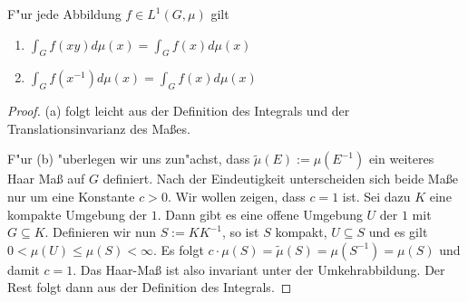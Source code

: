 	\begin{lemma}F"ur jede Abbildung $f\in L^{1}(G,\mu)$ gilt
		\begin{enumerate}[label=\emph{(\alph*)}]
			\item $\int_{G} f(xy)d\mu(x) = \int_{G} f(x)d\mu(x)$
			\item $\int_{G} f(x^{-1})d\mu(x) = \int_{G} f(x)d\mu(x)$
		\end{enumerate}
	\end{lemma}
	\begin{proof}
		(a) folgt leicht aus der Definition des Integrals und der Translationsinvarianz des Maßes.
		
		F"ur (b) "uberlegen wir uns zun"achst, dass $\tilde{\mu}(E):= \mu(E^{-1})$ ein weiteres Haar Maß auf $G$ definiert. Nach der Eindeutigkeit unterscheiden sich beide Maße nur um eine Konstante $c > 0$. Wir wollen zeigen, dass $c=1$ ist.
		Sei dazu $K$ eine kompakte Umgebung der $1$. Dann gibt es eine offene Umgebung $U$ der $1$ mit $G \subseteq K$. Definieren wir nun $S := KK^{-1}$, so ist $S$ kompakt, $U \subseteq S$ und es gilt $0 < \mu(U) \leq \mu(S)<\infty$. 
		Es folgt $ c\cdot \mu(S) = \tilde{\mu}(S) = \mu(S^{-1}) =\mu(S)$ und damit $c=1$. Das Haar-Maß ist also invariant unter der Umkehrabbildung. Der Rest folgt dann aus der Definition des Integrals.
	\end{proof}